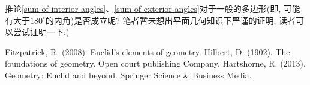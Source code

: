 \documentclass[main]{subfiles}
\begin{document}
\begin{remark}
	\textup{推论\ref{sum of interior angles}、\ref{sum of exterior angles}对于一般的多边形(即, 可能有大于$180^{\circ}$的内角)是否成立呢? 笔者暂未想出平面几何知识下严谨的证明, 读者可以尝试证明一下:)}
\end{remark}

{\small
\begin{thebibliography}{9}
	 Fitzpatrick, R. (2008). Euclid's elements of geometry.
	 Hilbert, D. (1902). The foundations of geometry. Open court publishing Company.
	 Hartshorne, R. (2013). Geometry: Euclid and beyond. Springer Science \& Business Media.
\end{thebibliography}
}
\end{document}

